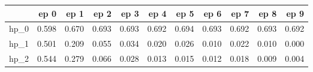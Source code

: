 \begin{tabular}{lrrrrrrrrrr}
\toprule
{} &   ep 0 &   ep 1 &   ep 2 &   ep 3 &   ep 4 &   ep 5 &   ep 6 &   ep 7 &   ep 8 &   ep 9 \\
\midrule
hp\_0 &  0.598 &  0.670 &  0.693 &  0.693 &  0.692 &  0.694 &  0.693 &  0.692 &  0.693 &  0.692 \\
hp\_1 &  0.501 &  0.209 &  0.055 &  0.034 &  0.020 &  0.026 &  0.010 &  0.022 &  0.010 &  0.000 \\
hp\_2 &  0.544 &  0.279 &  0.066 &  0.028 &  0.013 &  0.015 &  0.012 &  0.018 &  0.009 &  0.004 \\
\bottomrule
\end{tabular}
